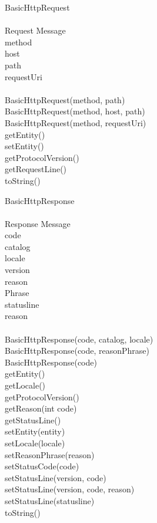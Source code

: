\documentclass{article}
\begin{document}
	\clearpage
	\begin{spacing}{1.0} 
	\noindent BasicHttpRequest\\
	\hspace*{\fill} \\ %
	\noindent Request Message\\
	\noindent method\\
	host\\
	path\\
	requestUri\\
	\hspace*{\fill} \\ %
	\noindent BasicHttpRequest(method, path)\\
	\noindent BasicHttpRequest(method, host, path)\\
	\noindent BasicHttpRequest(method, requestUri)\\
	\noindent getEntity()\\
	\noindent setEntity()\\
	getProtocolVersion()\\
	getRequestLine()\\
	toString()\\

	\clearpage

	\noindent BasicHttpResponse\\
	\hspace*{\fill} \\ %
	Response Message\\
	code\\
	catalog\\
	locale\\
	version\\
	reason\\
	Phrase\\
	statusline\\
	reason\\
	\hspace*{\fill} \\ %
	BasicHttpResponse(code, catalog, locale)\\
	BasicHttpResponse(code, reasonPhrase)\\
	BasicHttpResponse(code)\\
	getEntity()\\
	getLocale()\\
	getProtocolVersion()\\
	getReason(int code)\\
	getStatusLine() \\
	setEntity(entity)\\
	setLocale(locale)\\
	setReasonPhrase(reason)\\
	setStatusCode(code) \\
	setStatusLine(version, code) \\
	setStatusLine(version, code, reason)\\
	setStatusLine(statusline)\\
	toString() \\


\end{spacing}
\end{document}
